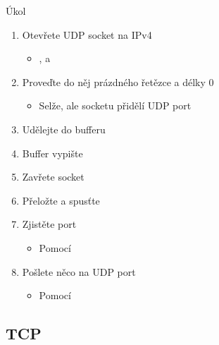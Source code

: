 \begin{frame}{Úkol}

  \begin{enumerate}
    \item Otevřete UDP socket na IPv4
    \begin{itemize}
      \item {},  a 
    \end{itemize}

    \item Proveďte do něj  prázdného řetězce a délky 0
    \begin{itemize}
      \item Selže, ale socketu přidělí UDP port
    \end{itemize}

    \item Udělejte  do bufferu
    \item Buffer vypište
    \item Zavřete socket
    \item Přeložte a spusťte

    \item Zjistěte port
    \begin{itemize}
      \item Pomocí 
    \end{itemize}

    \item Pošlete něco na UDP port
    \begin{itemize}
      \item Pomocí 
    \end{itemize}
  \end{enumerate}

\end{frame}

\subsection*{TCP}
\frame{\subsectionpage}

\fi

